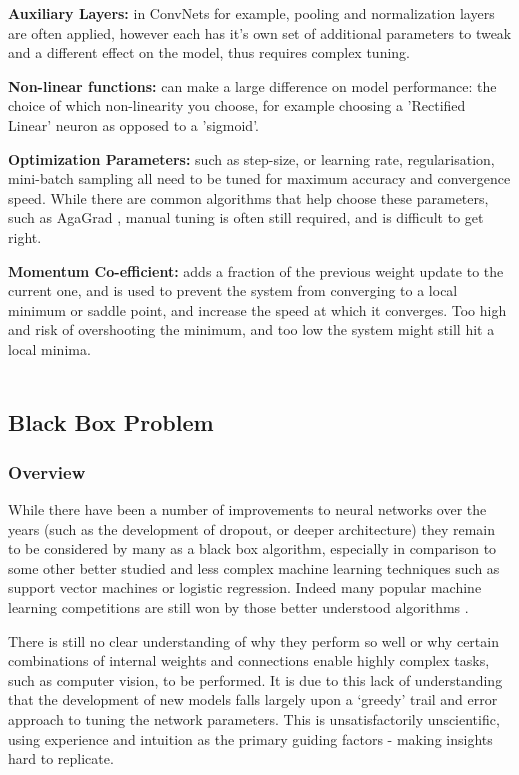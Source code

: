 \documentclass[a4paper,11pt,titlepage]{article}
\begin{document}
		\par 
		\textbf{Auxiliary Layers:} in ConvNets for example, pooling and normalization layers are often applied, however each has it's own set of additional parameters to tweak and a different effect on the model, thus requires complex tuning.
		\par 
		\textbf{Non-linear functions:} can make a large difference on model performance: the choice of which non-linearity you choose, for example choosing a 'Rectified Linear' neuron as opposed to a 'sigmoid'. 
		\par 
		\textbf{Optimization Parameters:} such as step-size, or learning rate, regularisation, mini-batch sampling all need to be tuned for maximum accuracy and convergence speed. While there are common algorithms that help choose these parameters, such as AgaGrad \cite{Duchi2011}, manual tuning is often still required, and is difficult to get right.
		\par
		\textbf{Momentum Co-efficient:} adds a fraction of the previous weight update to the current one, and is used to prevent the system from converging to a local minimum or saddle point, and increase the speed at which it converges. Too high and risk of overshooting the minimum, and too low the system might still hit a local minima.
\\\
	\subsection{Black Box Problem}
		\subsubsection{Overview}
		While there have been a number of improvements to neural networks over the years (such as the development of dropout, or deeper architecture) they remain to be considered by many as a black box algorithm, especially in comparison to some other better studied and less complex machine learning techniques such as support vector machines or logistic regression. Indeed many popular machine learning competitions are still won by those better understood algorithms \cite{Adams2015}.
		\par 
		There is still no clear understanding of why they perform so well or why certain combinations of internal weights and connections enable highly complex tasks, such as computer vision, to be performed. It is due to this lack of understanding that the development of new models falls largely upon a `greedy' trail and error approach to tuning the network parameters. This is unsatisfactorily unscientific, using experience and intuition as the primary guiding factors - making insights hard to replicate.
		\par
		
\end{document}
